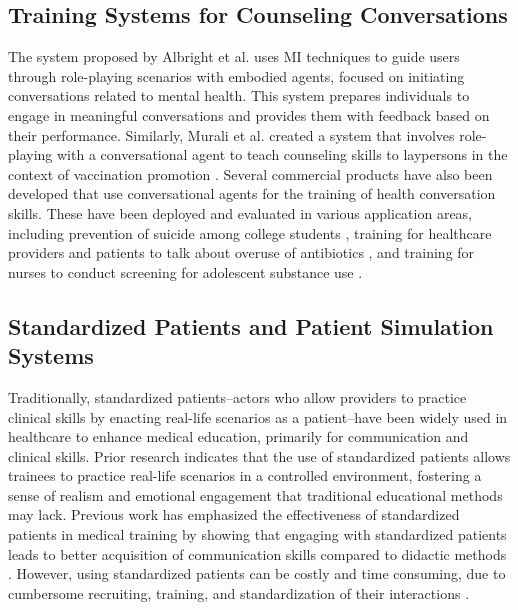 \subsection{Training Systems for Counseling Conversations} 
The system proposed by Albright et al. \cite{albright2016harnessing} uses MI techniques to guide users through role-playing scenarios with embodied agents, focused on initiating conversations related to mental health. This system prepares individuals to engage in meaningful conversations and provides them with feedback based on their performance.
Similarly, Murali et al. created a system that involves role-playing with a conversational agent to teach counseling skills to laypersons in the context of vaccination promotion \cite{muraliTrainingLayCounselors2022b}. Several commercial products have also been developed that use conversational agents for the training of health conversation skills. These have been deployed and evaluated in various application areas, including prevention of suicide among college students \cite{rein2018}, training for healthcare providers and patients to talk about overuse of antibiotics \cite{schoenthaler2017}, and training for nurses to conduct screening for adolescent substance use \cite{burmester2019}.

\subsection{Standardized Patients and Patient Simulation Systems}
Traditionally, standardized patients--actors who allow providers to practice clinical skills by enacting real-life scenarios as a patient--have been widely used in healthcare to enhance medical education, primarily for communication and clinical skills. Prior research indicates that the use of standardized patients allows trainees to practice real-life scenarios in a controlled environment, fostering a sense of realism and emotional engagement that traditional educational methods may lack. Previous work has emphasized the effectiveness of standardized patients in medical training by showing that engaging with standardized patients leads to better acquisition of communication skills compared to didactic methods \cite{lane2007use}. However, using standardized patients can be costly and time consuming, due to cumbersome recruiting, training, and standardization of their interactions \cite{flanagan2023standardized, whitaker2015motivational, swanson2013assessment}.

